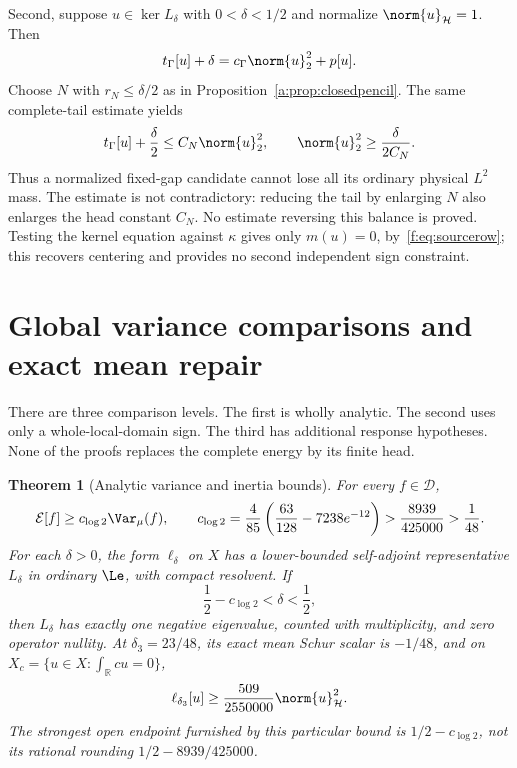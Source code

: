 \documentclass[11pt,a4paper]{article}
\numberwithin{equation}{section}
\newtheorem{theorem}{Theorem}[section]
\theoremstyle{definition}\newtheorem{definition}[theorem]{Definition}
\theoremstyle{remark}\newtheorem{remark}[theorem]{Remark}
\newcommand{\R}{\mathbb R}\newcommand{\C}{\mathbb C}\newcommand{\N}{\mathbb N}
\newcommand{\E}{\mathcal E}\newcommand{\D}{\mathcal D}
\newcommand{\Hh}{\mathcal H}\newcommand{\Hw}{\mathcal H}
\newcommand{\tg}{t_\Gamma}\newcommand{\cg}{c_\Gamma}
\begin{document}
Second, suppose $u\in\ker L_\delta$ with $0<\delta<1/2$ and normalize $\norm{u}_{\Hh}=1$. Then
\begin{equation}\label{f:eq:stateidentity}
 \tg[u]+\delta=\cg\norm{u}_2^2+p[u].
\end{equation}
Choose $N$ with $r_N\le\delta/2$ as in Proposition~\ref{a:prop:closedpencil}. The same complete-tail estimate yields
\begin{equation}\label{f:eq:statebound}
 \tg[u]+\frac\delta2\le C_N\norm{u}_2^2,
 \qquad \norm{u}_2^2\ge\frac{\delta}{2C_N}.
\end{equation}
Thus a normalized fixed-gap candidate cannot lose all its ordinary physical $L^2$ mass. The estimate is not contradictory: reducing the tail by enlarging $N$ also enlarges the head constant $C_N$. No estimate reversing this balance is proved. Testing the kernel equation against $\kappa$ gives only $m(u)=0$, by~\eqref{f:eq:sourcerow}; this recovers centering and provides no second independent sign constraint.


\section{Global variance comparisons and exact mean repair}\label{sec:bounds}
There are three comparison levels. The first is wholly analytic. The second uses only a whole-local-domain sign. The third has additional response hypotheses. None of the proofs replaces the complete energy by its finite head.


\begin{theorem}[Analytic variance and inertia bounds]\label{a:thm:mainseed}
For every $f\in\D$,
\begin{equation}\label{a:eq:mainseed}
 \E[f]\ge c_{\log 2}\Var_\mu(f),\qquad
 c_{\log 2}=\frac4{85}\left(\frac{63}{128}-7238e^{-12}\right)
 >\frac{8939}{425000}>\frac1{48}.
\end{equation}
For each $\delta>0$, the form $\ell_\delta$ on $X$ has a lower-bounded self-adjoint representative $L_\delta$ in ordinary $\Le$, with compact resolvent. If
\[
 \frac12-c_{\log 2}<\delta<\frac12,
\]
then $L_\delta$ has exactly one negative eigenvalue, counted with multiplicity, and zero operator nullity. At $\delta_3=23/48$, its exact mean Schur scalar is $-1/48$, and on $X_c=\{u\in X:\int_\R cu=0\}$,
\begin{equation}\label{a:eq:mainmargin}
 \ell_{\delta_3}[u]\ge\frac{509}{2550000}\norm{u}_{\Hh}^2.
\end{equation}
The strongest open endpoint furnished by this particular bound is $1/2-c_{\log 2}$, not its rational rounding $1/2-8939/425000$.
\end{theorem}
\end{document}
